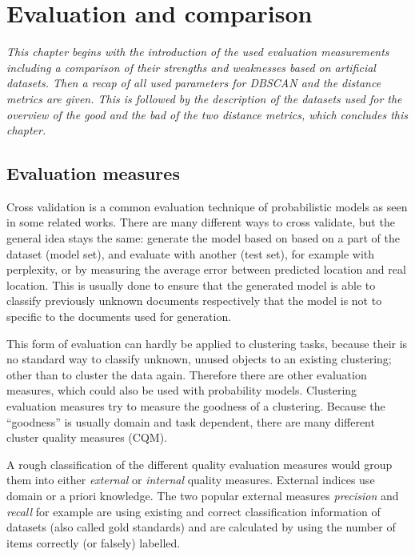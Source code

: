\chapter{Evaluation and comparison}
\emph{%
This chapter begins with the introduction of the used evaluation measurements including a comparison of their strengths and weaknesses based on artificial datasets. Then a recap of all used parameters for DBSCAN and the distance metrics are given. This is followed by the description of the datasets used for the overview of the good and the bad of the two distance metrics, which concludes this chapter.
}\label{chap:eval}

\section{Evaluation measures}\label{sec:cqm}
Cross validation\cite{Park2009} is a common evaluation technique  of probabilistic models as seen in some related works\cite{Hong2012, Yin2011}. There are many different ways to cross validate, but the general idea stays the same: generate the model based on based on a part of the dataset (model set), and evaluate with another (test set), for example with perplexity, or by measuring the average error between predicted location and real location. This is usually done to ensure that the generated model is able to classify previously unknown documents respectively that the model is not to specific to the documents used for generation.

This form of evaluation can hardly be applied to clustering tasks, because their is no standard way to classify unknown, unused objects to an existing clustering; other than to cluster the data again. Therefore there are other evaluation measures, which could also be used with probability models. Clustering evaluation measures try to measure the goodness of a clustering. Because the \enquote{goodness} is usually domain and task dependent, there are many different cluster quality measures (CQM).

A rough classification of the different quality evaluation measures would group them into either \emph{external} or \emph{internal} quality measures\cite{Rendon2011}. External indices use domain or a priori knowledge. The two popular external measures \emph{precision} and \emph{recall} for example are using existing and correct classification information of datasets (also called gold standards) and are calculated by using the number of items correctly (or falsely) labelled. 


